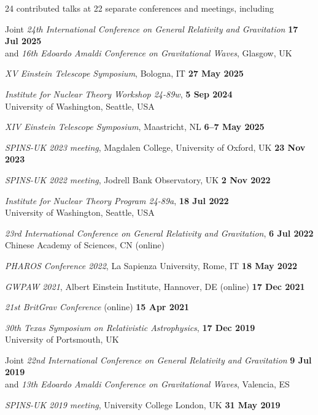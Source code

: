 24 contributed talks at 22 separate conferences and meetings, including

\begin{etaremune}
    \item Joint \textit{24th International Conference on General Relativity and
    Gravitation} \hfill \textbf{17 Jul 2025} \\
    and \textit{16th Edoardo Amaldi Conference on Gravitational Waves}, Glasgow, UK
    \item \textit{XV Einstein Telescope Symposium}, Bologna, IT
    \hfill \textbf{27 May 2025}
    \item \textit{Institute for Nuclear Theory Workshop 24-89w},
    \hfill \textbf{5 Sep 2024} \\
    University of Washington, Seattle, USA
    \item \textit{XIV Einstein Telescope Symposium}, Maastricht, NL
    \hfill \textbf{6--7 May 2025}
    \item \textit{SPINS-UK 2023 meeting}, 
    Magdalen College, University of Oxford, UK \hfill \textbf{23 Nov 2023}
    \item \textit{SPINS-UK 2022 meeting}, Jodrell Bank Observatory, UK
    \hfill \textbf{2 Nov 2022}
    \item \textit{Institute for Nuclear Theory Program 24-89a},
    \hfill \textbf{18 Jul 2022} \\
    University of Washington, Seattle, USA
    \item \textit{23rd International Conference on General Relativity and
    Gravitation}, \hfill \textbf{6 Jul 2022} \\
    Chinese Academy of Sciences, CN (online)
    \item \textit{PHAROS Conference 2022}, La Sapienza University, Rome, IT
    \hfill \textbf{18 May 2022}
    \item \textit{GWPAW 2021}, Albert Einstein Institute, Hannover, DE (online)
    \hfill \textbf{17 Dec 2021}
    \item \textit{21st BritGrav Conference} (online)
    \hfill \textbf{15 Apr 2021}
    \item \textit{30th Texas Symposium on Relativistic Astrophysics},
    \hfill \textbf{17 Dec 2019} \\
    University of Portsmouth, UK
    \item Joint \textit{22nd International Conference on General Relativity and
    Gravitation} \hfill \textbf{9 Jul 2019} \\
    and \textit{13th Edoardo Amaldi Conference on Gravitational Waves},
    Valencia, ES
    \item \textit{SPINS-UK 2019 meeting}, University College London, UK
    \hfill \textbf{31 May 2019}
\end{etaremune}


